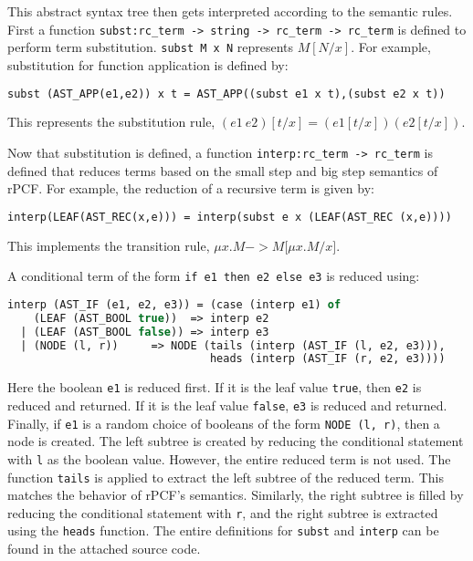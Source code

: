 This abstract syntax tree then gets interpreted according to the semantic rules.  First a function \texttt{subst:rc\_term -> string -> rc\_term -> rc\_term} is defined to perform term substitution.  \texttt{subst M x N} represents $M[N/x]$.  For example, substitution for function application is defined by:
\begin{lstlisting}[language=ML]
subst (AST_APP(e1,e2)) x t = AST_APP((subst e1 x t),(subst e2 x t))
\end{lstlisting}
This represents the substitution rule, $(e1\ e2)[t/x] = (e1[t/x])(e2[t/x])$.

Now that substitution is defined, a function \texttt{interp:rc\_term -> rc\_term} is defined that reduces terms based on the small step and big step semantics of rPCF.  For example, the reduction of a recursive term is given by:
\begin{lstlisting}[language=ML]
interp(LEAF(AST_REC(x,e))) = interp(subst e x (LEAF(AST_REC (x,e))))
\end{lstlisting}
This implements the transition rule, $\mu x.M -> M{[}\mu x.M/x{]}$.  

A conditional term of the form \texttt{if e1 then e2 else e3} is reduced using:
\begin{lstlisting}[language=ML]
interp (AST_IF (e1, e2, e3)) = (case (interp e1) of
    (LEAF (AST_BOOL true))  => interp e2
  | (LEAF (AST_BOOL false)) => interp e3
  | (NODE (l, r))     => NODE (tails (interp (AST_IF (l, e2, e3))), 
                               heads (interp (AST_IF (r, e2, e3))))	

\end{lstlisting}
Here the boolean \texttt{e1} is reduced first.  If it is the leaf value \texttt{true}, then \texttt{e2} is reduced and returned.  If it is the leaf value \texttt{false}, \texttt{e3} is reduced and returned.  Finally, if \texttt{e1} is a random choice of booleans of the form \texttt{NODE (l, r)}, then a node is created.  The left subtree is created by reducing the conditional statement with \texttt{l} as the boolean value.  However, the entire reduced term is not used.  The function \texttt{tails} is applied to extract the left subtree of the reduced term.  This matches the behavior of rPCF's semantics.  Similarly, the right subtree is filled by reducing the conditional statement with \texttt{r}, and the right subtree is extracted using the \texttt{heads} function.  The entire definitions for \texttt{subst} and \texttt{interp} can be found in the attached source code.

